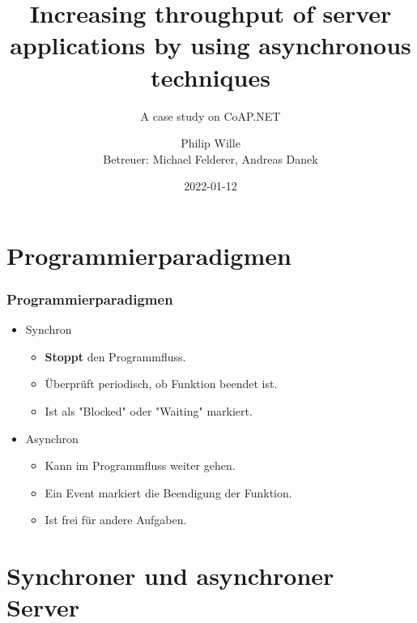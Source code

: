 \documentclass[11pt,t,usepdftitle=false,aspectratio=169,usenames,dvipsnames]{beamer}
\title[Finale Präsentation CoAP.NET]{Increasing throughput of server applications by using asynchronous techniques}
\subtitle{A case study on CoAP.NET}
\author{Philip Wille\\Betreuer: Michael Felderer, Andreas Danek}
\date{2022-01-12}
\begin{document}
    \maketitle

    \section{Programmierparadigmen}
    \label{sec:programmierparadigmen}
    \begin{frame}
        \frametitle{Programmierparadigmen}
        \begin{itemize}
            \item<1-> Synchron
            \begin{itemize}
                \item<3-> \textcolor{uibkblue}{\textbf{Stoppt}} den Programmfluss.
                \item<5-> Überprüft periodisch, ob Funktion beendet ist.
                \item<7-> Ist als "Blocked" oder "Waiting" markiert.
            \end{itemize}
            \item<2-> Asynchron
            \begin{itemize}
                \item<4-> Kann im Programmfluss weiter gehen.
                \item<6-> Ein Event markiert die Beendigung der Funktion.
                \item<8-> Ist frei für andere Aufgaben.
            \end{itemize}
        \end{itemize}
    \end{frame}

    \section{Synchroner und asynchroner Server}
    \label{sec:synchroner-und-asynchroner-server}
\end{document}
